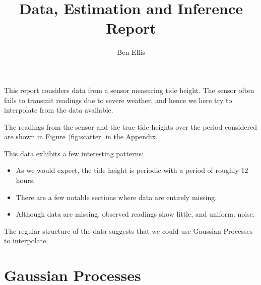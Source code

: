 \documentclass[10pt]{article}
\date{}
\begin{document}
\title{Data, Estimation and Inference Report}
\author{Ben Ellis}
\maketitle
This report considers data from a sensor measuring tide height.
The sensor often fails to transmit readings due to severe weather, and 
hence we here try to interpolate from the data available.

The readings from the sensor and the true tide heights over the period 
considered are shown in Figure~\ref{fig:scatter} in the Appendix. 


This data exhibits a few interesting patterns:
\begin{itemize}
    \item As we would expect, the tide height is periodic with a period of roughly 12 hours.
    \item There are a few notable sections where data are entirely missing.
    \item Although data are missing, observed readings show little, and uniform, noise. 
\end{itemize}

The regular structure of the data suggests that we could use Gaussian Processes to interpolate.

\section*{Gaussian Processes}
\end{document}
